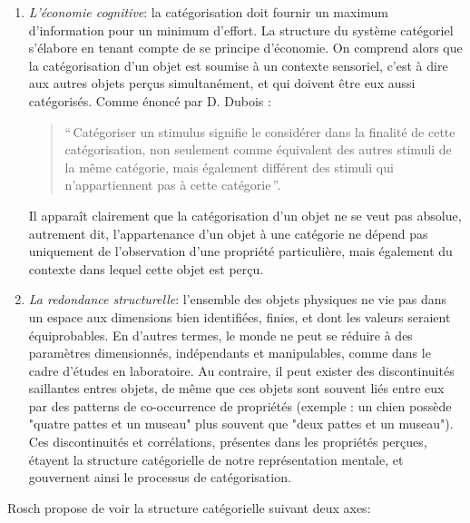 \begin{enumerate}
\item \textit{L'économie cognitive}: la catégorisation doit fournir un maximum d'information pour un minimum d'effort. La structure du système catégoriel s'élabore en tenant compte de se principe d'économie. On comprend alors que la catégorisation d'un objet est soumise à un contexte sensoriel, c'est à dire aux autres objets perçus simultanément, et qui doivent être eux aussi catégorisés. Comme énoncé par D. Dubois \citep[p. 33]{dubois1991semantique}:
\begin{quote}
``\,Catégoriser un stimulus signifie le considérer dans la finalité de cette catégorisation, non seulement comme équivalent des autres stimuli de la même catégorie, mais également différent des stimuli qui n'appartiennent pas à cette catégorie\,''.
\end{quote}

Il apparaît clairement que la catégorisation d'un objet ne se veut pas absolue, autrement dit, l'appartenance d'un objet à une catégorie ne dépend pas uniquement de l'observation d'une propriété particulière, mais également du contexte dans lequel cette objet est perçu.

\item \textit{La redondance structurelle}: l'ensemble des objets physiques ne vie pas dans un espace aux dimensions bien identifiées, finies, et dont les valeurs seraient équiprobables. En d'autres termes, le monde ne peut se réduire à des paramètres dimensionnés, indépendants et manipulables, comme dans le cadre d'études en laboratoire. Au contraire, il peut exister des discontinuités saillantes entres objets, de même que ces objets sont souvent liés entre eux par des patterns de co-occurrence de propriétés (exemple : un chien possède "quatre pattes et un museau" plus souvent que "deux pattes et un museau"). Ces discontinuités et corrélations, présentes dans les propriétés perçues, étayent la structure catégorielle de notre représentation mentale,  et gouvernent ainsi le processus de catégorisation.
\end{enumerate} 

Rosch propose de voir la structure catégorielle suivant deux axes:

